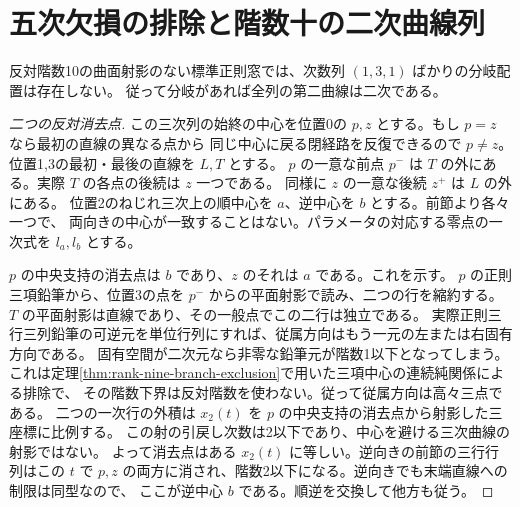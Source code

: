 \section{五次欠損の排除と階数十の二次曲線列}
\label{sec:rank-ten-quintic-centers}
\begin{theorem}\label{thm:rank-ten-quintic-centers}
反対階数10の曲面射影のない標準正則窓では、次数列 $(1,3,1)$ ばかりの分岐配置は存在しない。
従って分岐があれば全列の第二曲線は二次である。
\end{theorem}
\begin{proof}[二つの反対消去点]
この三次列の始終の中心を位置0の $p,z$ とする。もし $p=z$ なら最初の直線の異なる点から
同じ中心に戻る閉経路を反復できるので $p\ne z$。位置1,3の最初・最後の直線を $L,T$ とする。
$p$ の一意な前点 $p^-$ は $T$ の外にある。実際 $T$ の各点の後続は $z$ 一つである。
同様に $z$ の一意な後続 $z^+$ は $L$ の外にある。
位置2のねじれ三次上の順中心を $a$、逆中心を $b$ とする。前節より各々一つで、
両向きの中心が一致することはない。パラメータの対応する零点の一次式を $l_a,l_b$ とする。

$p$ の中央支持の消去点は $b$ であり、$z$ のそれは $a$ である。これを示す。
$p$ の正則三項鉛筆から、位置3の点を $p^-$ からの平面射影で読み、二つの行を縮約する。
$T$ の平面射影は直線であり、その一般点でこの二行は独立である。
実際正則三行三列鉛筆の可逆元を単位行列にすれば、従属方向はもう一元の左または右固有方向である。
固有空間が二次元なら非零な鉛筆元が階数1以下となってしまう。
これは定理\ref{thm:rank-nine-branch-exclusion}で用いた三項中心の連続純関係による排除で、
その階数下界は反対階数を使わない。従って従属方向は高々三点である。
二つの一次行の外積は $x_2(t)$ を $p$ の中央支持の消去点から射影した三座標に比例する。
この射の引戻し次数は2以下であり、中心を避ける三次曲線の射影ではない。
よって消去点はある $x_2(t)$ に等しい。逆向きの前節の三行行列はこの $t$ で
$p,z$ の両方に消され、階数2以下になる。逆向きでも末端直線への制限は同型なので、
ここが逆中心 $b$ である。順逆を交換して他方も従う。
\end{proof}
